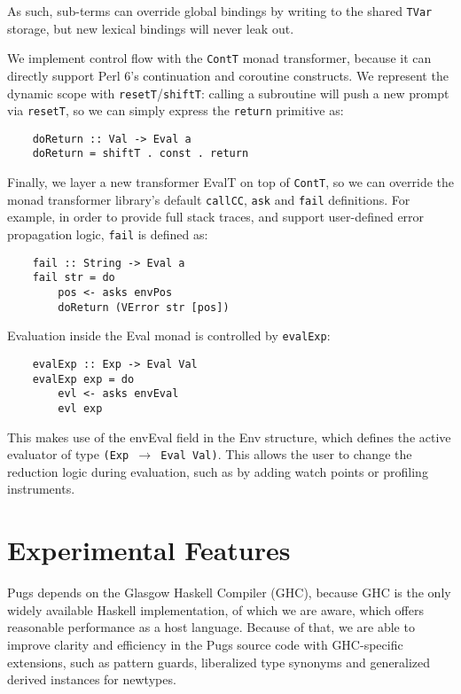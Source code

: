 \documentclass[]{sigplanconf}
\newcommand{\code}[1]{\texttt{#1}}
\begin{document}
As such, sub-terms can override global bindings by writing to the shared
\code{TVar} storage, but new lexical bindings will never leak out.

We implement control flow with the \code{ContT} monad transformer, because it
can directly support Perl 6's continuation and coroutine constructs.  We
represent the dynamic scope with \code{resetT}/\code{shiftT}: calling a
subroutine will push a new prompt via \code{resetT}, so we can simply express
the \code{return} primitive as:

\begin{lstlisting}
    doReturn :: Val -> Eval a
    doReturn = shiftT . const . return
\end{lstlisting}

Finally, we layer a new transformer EvalT on top of \code{ContT}, so we can
override the monad transformer library's default \code{callCC}, \code{ask} and
\code{fail} definitions.  For example, in order to provide full stack traces,
and support user-defined error propagation logic, \code{fail} is defined as:

\begin{lstlisting}
    fail :: String -> Eval a
    fail str = do
        pos <- asks envPos
        doReturn (VError str [pos])
\end{lstlisting}

Evaluation inside the Eval monad is controlled by \code{evalExp}:

\begin{lstlisting}
    evalExp :: Exp -> Eval Val
    evalExp exp = do
        evl <- asks envEval
        evl exp
\end{lstlisting}

This makes use of the envEval field in the Env structure, which defines the
active evaluator of type \code{(Exp $\to$ Eval Val)}.  This allows the user to
change the reduction logic during evaluation, such as by adding watch points or
profiling instruments.


\section{Experimental Features}
\label{sec:ExperimentalFeatures}

Pugs depends on the Glasgow Haskell Compiler (GHC), because GHC is the only
widely available Haskell implementation, of which we are aware, which offers
reasonable performance as a host language.  Because of that, we are able to
improve clarity and efficiency in the Pugs source code with GHC-specific
extensions, such as pattern guards, liberalized type synonyms and generalized
derived instances for newtypes.
\end{document}
